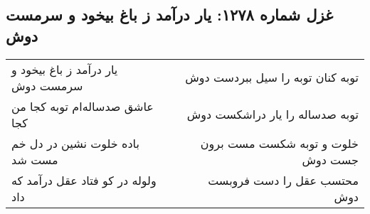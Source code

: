 \begin{center}
\section*{غزل شماره ۱۲۷۸: یار درآمد ز باغ بیخود و سرمست دوش}
\label{sec:1278}
\begin{longtable}{l p{0.5cm} r}
یار درآمد ز باغ بیخود و سرمست دوش
&&
توبه کنان توبه را سیل ببردست دوش
\\
عاشق صدساله‌ام توبه کجا من کجا
&&
توبه صدساله را یار دراشکست دوش
\\
باده خلوت نشین در دل خم مست شد
&&
خلوت و توبه شکست مست برون جست دوش
\\
ولوله در کو فتاد عقل درآمد که داد
&&
محتسب عقل را دست فروبست دوش
\\
\end{longtable}
\end{center}
